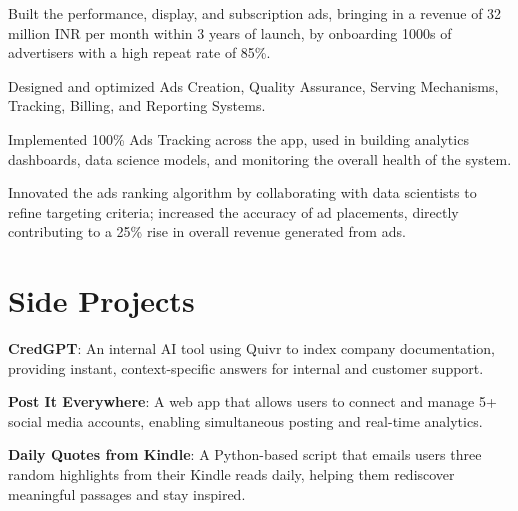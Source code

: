 \documentclass[]{deedy-resume-openfont}
\begin{document}
\begin{minipage}[t]{0.69\textwidth}
\vspace{\topsep}
\begin{tightemize}
\item Built the performance, display, and subscription ads, bringing in a revenue of 32 million INR per month within 3 years of launch, by onboarding 1000s of advertisers with a high repeat rate of 85\%.
\item Designed and optimized Ads Creation, Quality Assurance, Serving Mechanisms, Tracking, Billing, and Reporting Systems.
\item Implemented 100\% Ads Tracking across the app, used in building analytics dashboards, data science models, and monitoring the overall health of the system.
\item Innovated the ads ranking algorithm by collaborating with data scientists to refine targeting criteria; increased the accuracy of ad placements, directly contributing to a 25\% rise in overall revenue generated from ads.
\end{tightemize}
\sectionsep


\section{Side Projects}
\vspace{\topsep}
\begin{tightemize}
\item \textbf{CredGPT}: An internal AI tool using Quivr to index company documentation, providing instant, context-specific answers for internal and customer support.
\item \textbf{Post It Everywhere}: A web app that allows users to connect and manage 5+ social media accounts, enabling simultaneous posting and real-time analytics.
\item \textbf{Daily Quotes from Kindle}: A Python-based script that emails users three random highlights from their Kindle reads daily, helping them rediscover meaningful passages and stay inspired.
\end{tightemize}
\sectionsep




\end{minipage}
\end{document}
